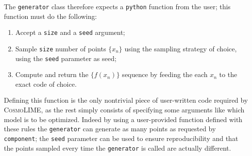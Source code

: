 The \texttt{generator} class therefore expects a \texttt{python} function from the user; this function must do the following:
\begin{enumerate}
    \item Accept a \texttt{size} and a \texttt{seed} argument;
    \item Sample \texttt{size} number of points $\{x_n\}$ using the sampling strategy of choice, using the \texttt{seed} parameter as seed;
    \item Compute and return the $\{f(x_n)\}$ sequence by feeding the each $x_n$ to the exact code of choice.
\end{enumerate}

Defining this function is the only nontrivial piece of user-written code required by \textsc{CosmoLIME}, as the rest simply consists of specifying some arguments like which model is to be optimized. Indeed by using a user-provided function defined with these rules the \texttt{generator} can generate as many points as requested by \texttt{component}; the \texttt{seed} parameter can be used to ensure reproducibility and that the points sampled every time the \texttt{generator} is called are actually different.

